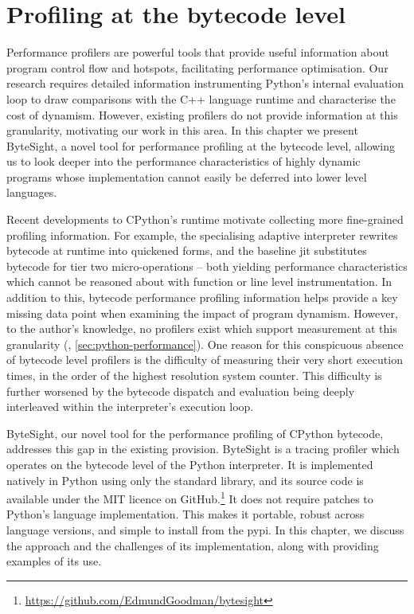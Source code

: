 \chapter{Profiling at the bytecode level} %
\label{chap:profiling-bytecode}

Performance profilers are powerful tools that provide useful information about program control flow and hotspots, facilitating performance optimisation.
Our research requires detailed information instrumenting Python's internal evaluation loop to draw comparisons with the C++ language runtime and characterise the cost of dynamism. However, existing profilers do not provide information at this granularity, motivating our work in this area. %
In this chapter we present ByteSight, a novel tool for performance profiling at the bytecode level, allowing us to look deeper into the performance characteristics of highly dynamic programs whose implementation cannot easily be deferred into lower level languages.


Recent developments to CPython's runtime motivate collecting more fine-grained profiling information.
For example, the specialising adaptive interpreter rewrites bytecode at runtime into quickened forms, and the baseline \ac{jit} substitutes bytecode for tier two micro-operations -- both yielding performance characteristics which cannot be reasoned about with function or line level instrumentation.
In addition to this, bytecode performance profiling information helps provide a key missing data point when examining the impact of program dynamism.
However, to the author's knowledge, no profilers exist which support measurement at this granularity (, \autoref{sec:python-performance}).
One reason for this conspicuous absence of bytecode level profilers is the difficulty of measuring their very short execution times, in the order of the highest resolution system counter. This difficulty is further worsened by the bytecode dispatch and evaluation being deeply interleaved within the interpreter's execution loop.

ByteSight, our novel tool for the performance profiling of CPython bytecode, addresses this gap in the existing provision.
ByteSight is a tracing profiler which operates on the bytecode level of the Python interpreter. It is implemented natively in Python using only the standard library, and its source code is available under the MIT licence on GitHub.\ifsubmission\else\footnote{\scriptsize{\url{https://github.com/EdmundGoodman/bytesight}}}\fi
It does not require patches to Python's language implementation. This makes it portable, robust across language versions, and simple to install from the \acf{pypi}.
In this chapter, we discuss the approach and the challenges of its implementation, along with providing examples of its use.


